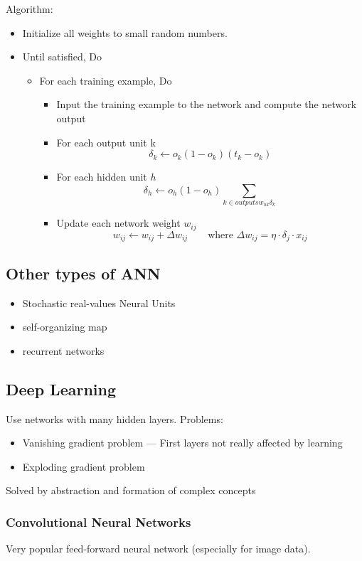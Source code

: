 Algorithm:
\begin{itemize}
\item Initialize all weights to small random numbers.
\item Until satisfied, Do
  \begin{itemize}
  \item For each training example, Do
    \begin{itemize}
    \item Input the training example to the network and compute the network output
    \item For each output unit k
      \[\delta_k \leftarrow o_k (1 - o_k)(t_k - o_k)\]
    \item For each hidden unit \(h\)
      \[\delta_h \leftarrow o_h(1 - o_h) \sum_{k \in \mathit{outputs} w_{hk}\delta_k}\]
    \item Update each network weight \(w_{ij}\)
      \[w_{ij} \leftarrow w_{ij} + \Delta w_{ij} \qquad \text{where } \Delta w_{ij} = \eta \cdot \delta_j \cdot x_{ij}\]
    \end{itemize}
  \end{itemize}
\end{itemize}

\subsection{Other types of ANN}%
\label{nn:sub:other_types_of_ann}
\begin{itemize}
\item Stochastic real-values Neural Units
\item self-organizing map
\item recurrent networks
\end{itemize}

\subsection{Deep Learning}%
\label{nn:sub:deep_learning}
Use networks with many hidden layers. Problems:
\begin{itemize}
\item Vanishing gradient problem --- First layers not really affected by learning
\item Exploding gradient problem
\end{itemize}
Solved by abstraction and formation of complex concepts

\subsubsection{Convolutional Neural Networks}%
\label{nn:ssub:convolutional_neural_networks}
Very popular feed-forward neural network (especially for image data).\\

